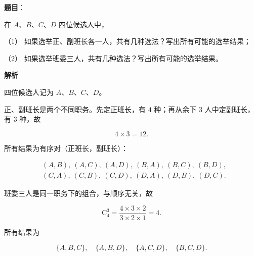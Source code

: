 \begin{answer}

\textbf{题目}：

在 $A$、$B$、$C$、$D$ 四位候选人中，

（1） 如果选举正、副班长各一人，共有几种选法？写出所有可能的选举结果；

（2） 如果选举班委三人，共有几种选法？写出所有可能的选举结果。

\textbf{解析}

四位候选人记为 $A$、$B$、$C$、$D$。


正、副班长是两个不同职务。先定正班长，有 $4$ 种；再从余下 $3$ 人中定副班长，有 $3$ 种，故

\nopagebreak[4]
\[
4\times 3=12.
\]

所有结果为有序对（正班长，副班长）：

\nopagebreak[4]
\[
\begin{aligned}
&(A,B),\ (A,C),\ (A,D),\ (B,A),\ (B,C),\ (B,D),\\
&(C,A),\ (C,B),\ (C,D),\ (D,A),\ (D,B),\ (D,C).
\end{aligned}
\]


班委三人是同一职务下的组合，与顺序无关，故

\nopagebreak[4]
\[
\mathrm{C}_4^3=\frac{4\times3\times2}{3\times2\times1}=4.
\]

所有结果为

\nopagebreak[4]
\[
\{A,B,C\},\quad \{A,B,D\},\quad \{A,C,D\},\quad \{B,C,D\}.
\]



\end{answer}
